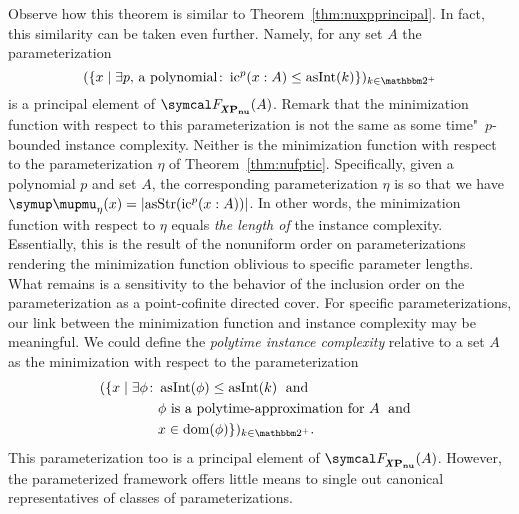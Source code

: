 Observe how this theorem is similar to Theorem~\ref{thm:nuxpprincipal}.
In fact, this similarity can be taken even further.
Namely, for any set $A$ the parameterization
\begin{equation*}
  (\{x \st \exists p\text{, a polynomial}\colon \ic^p(x : A) \le \asNat(k)\})_{k \in \binary^+}
\end{equation*}
is a principal element of $\calF_\clXnu{P}(A)$.
Remark that the minimization function with respect to this parameterization is not the same as some time"~$p$-bounded instance complexity.
Neither is the minimization function with respect to the parameterization $\eta$ of Theorem~\ref{thm:nufptic}.
Specifically, given a polynomial $p$ and set $A$, the corresponding parameterization $\eta$ is so that we have $\mu_\eta(x) = \length{\asStr(\ic^p(x : A))}$.
In other words, the minimization function with respect to $\eta$ equals \emph{the length of} the instance complexity.
Essentially, this is the result of the nonuniform order on parameterizations rendering the minimization function oblivious to specific parameter lengths.
What remains is a sensitivity to the behavior of the inclusion order on the parameterization as a point-cofinite directed cover.
For specific parameterizations, our link between the minimization function and instance complexity may be meaningful.
We could define the \emph{polytime instance complexity} relative to a set $A$ as the minimization with respect to the parameterization
\begin{align*}
  (\{x \st \exists \phi\colon &\asNat(\phi) \le \asNat(k) \reland \\
  	&\text{$\phi$ is a polytime-approximation for $A$} \reland \\
  	&x \in \dom(\phi)\})_{k \in \binary^+}.
\end{align*}
This parameterization too is a principal element of $\calF_\clXnu{P}(A)$.
However, the parameterized framework offers little means to single out canonical representatives of classes of parameterizations.

